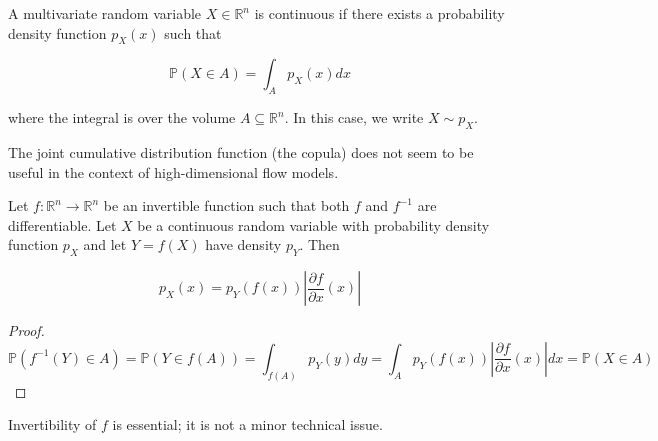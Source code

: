\begin{concept}
    A multivariate random variable $X \in \mathbb{R}^{n}$ is continuous if there exists a probability density function $p_{X}(x)$ such that

    $$
    \mathbb{P}(X \in A)=\int_{A} p_{X}(x) d x
    $$

    where the integral is over the volume $A \subseteq \mathbb{R}^{n}$. In this case, we write $X \sim p_{X}$.

    The joint cumulative distribution function (the copula) does not seem to be useful in the context of high-dimensional flow models.
\end{concept}

\begin{concept}
    Let $f: \mathbb{R}^{n} \rightarrow \mathbb{R}^{n}$ be an invertible function such that both $f$ and $f^{-1}$ are differentiable. Let $X$ be a continuous random variable with probability density function $p_{X}$ and let $Y=f(X)$ have density $p_{Y}$. Then

    $$
    p_{X}(x)=p_{Y}(f(x))\left|\frac{\partial f}{\partial x}(x)\right|
    $$

    \begin{proof}
        $$
        \mathbb{P}\left(f^{-1}(Y) \in A\right)=\mathbb{P}(Y \in f(A))=\int_{f(A)} p_{Y}(y) d y=\int_{A} p_{Y}(f(x))\left|\frac{\partial f}{\partial x}(x)\right| d x=\mathbb{P}(X \in A)
        $$
    \end{proof}

    Invertibility of $f$ is essential; it is not a minor technical issue.
\end{concept}

